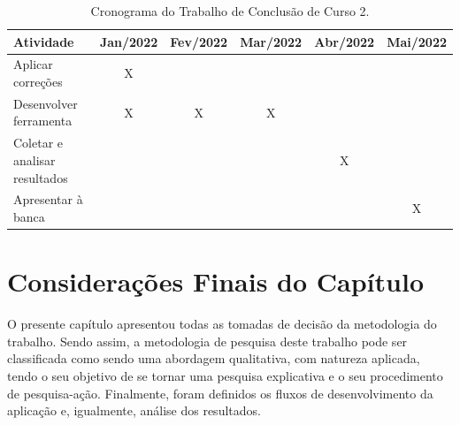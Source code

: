 \begin{table}[!h]
    \centering
    \caption{Cronograma do Trabalho de Conclusão de Curso 2.}
    \label{tab:cronograma_tcc2}
    \begin{tabular} {p{4cm}|c|c|c|c|c}
    \hline
        \textbf{Atividade} & \textbf{Jan/2022} & \textbf{Fev/2022} & \textbf{Mar/2022} & \textbf{Abr/2022} & \textbf{Mai/2022} \\
        \hline
        Aplicar correções & X &  &  &  &  \\
        \hline
        Desenvolver ferramenta  & X & X & X &  &  \\
        \hline
        Coletar e analisar resultados  &  &  &  & X &  \\
        \hline
        Apresentar à banca  &  &  &  &  & X \\
        \hline
    \end{tabular}
    \label{tab:cronograma_tcc2}
\end{table}

\section{Considerações Finais do Capítulo}

O presente capítulo apresentou todas as tomadas de decisão da metodologia do trabalho. Sendo assim, a metodologia de pesquisa deste trabalho pode ser  classificada como sendo uma abordagem qualitativa, com natureza aplicada, tendo o seu objetivo de se tornar uma pesquisa explicativa e o seu procedimento de pesquisa-ação. Finalmente, foram definidos os fluxos de desenvolvimento da aplicação e, igualmente, análise dos resultados.
